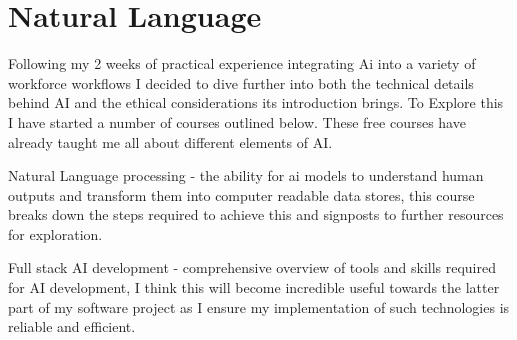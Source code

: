 \section{Natural Language}
\label{research:NaturalLanguage}
Following my 2 weeks of practical experience integrating Ai into a variety of workforce workflows I decided to dive further into both the technical details behind AI and the ethical considerations its introduction brings. To Explore this I have started a number of courses outlined below. These free courses have already taught me all about different elements of AI.

Natural Language processing \cite{IntroductionHuggingFace}- the ability for ai models to understand human outputs and transform them into computer readable data stores, this course breaks down the steps required to achieve this and signposts to further resources for exploration.

Full stack AI development \cite{stackFullStackLecture} - comprehensive overview of tools and skills required for AI development, I think this will become incredible useful towards the latter part of my software project as I ensure my implementation of such technologies is reliable and efficient.
